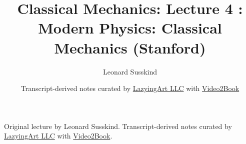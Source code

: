 \documentclass[11pt,oneside]{book}
\begin{document}
\frontmatter
\title{Classical Mechanics: Lecture 4 : Modern Physics: Classical Mechanics (Stanford)}
\author{Leonard Susskind}
\date{Transcript-derived notes curated by \href{https://lazying.art}{LazyingArt LLC} with \href{https://github.com/lachlanchen/Video2Book}{Video2Book}}
\maketitle
\begin{center}
\small Original lecture by Leonard Susskind. Transcript-derived notes curated by \href{https://lazying.art}{LazyingArt LLC} with \href{https://github.com/lachlanchen/Video2Book}{Video2Book}.
\end{center}
\clearpage
\mainmatter

\end{document}
